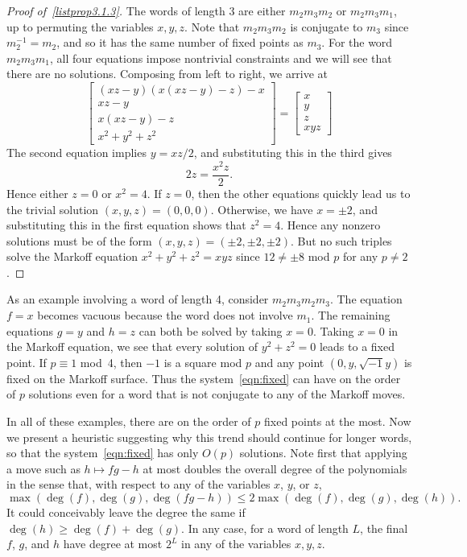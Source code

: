 \documentclass[10pt]{amsart}
\theoremstyle{definition}\newtheorem{defi}[theo]{Definition}\newtheorem{rema}[theo]{Remark}\newtheorem{exam}[theo]{Example}\newtheorem{exem}[theo]{Example}\newtheorem{nota}[theo]{Notation}
\begin{document}
\begin{proof}[{Proof of~\eqref{listprop3.1.3}}]
The words of length 3 are either $m_2m_3m_2$ or $m_2m_3m_1$, up to permuting the variables $x,y,z$. Note that $m_2m_3m_2$ is conjugate to $m_3$ since\linebreak$m_2^{-1}=m_2$, and so it has the same number of fixed points as $m_3$. For the word $m_2m_3m_1$, all four equations impose nontrivial constraints and we will see that there are no solutions. Composing from left to right, we arrive at
\[
\begin{bmatrix}
(xz-y)(x(xz-y)-z)-x \\
xz- y \\
x(xz-y) - z \\
x^2+y^2+z^2
\end{bmatrix} =
\begin{bmatrix}
x \\
y \\
z \\
xyz
\end{bmatrix}
\]
The second equation implies $y = xz/2$, and substituting this in the third gives
\[
2z = \frac{x^2z}{2}.
\]
Hence either $z=0$ or $x^2=4$. If $z=0$, then the other equations quickly lead us to the trivial solution $(x,y,z)=(0,0,0)$. Otherwise, we have $x = \pm 2$, and substituting this in the first equation shows that $z^2=4$. Hence any nonzero solutions must be of the form $(x,y,z) = (\pm 2, \pm 2, \pm 2)$. But no such triples solve the Markoff equation $x^2 + y^2 + z^2 = xyz$ since $12 \neq \pm 8$ mod $p$ for any $p \neq 2$.
\end{proof}

As an example involving a word of length 4, consider $m_2m_3m_2m_3$. The equation $f=x$ becomes vacuous because the word does not involve $m_1$. The remaining equations $g=y$ and $h=z$ can both be solved by taking $x=0$. Taking $x=0$ in the Markoff equation, we see that every solution of $y^2+z^2=0$ leads to a fixed point. If $p \equiv 1$ mod~4, then $-1$ is a square mod $p$ and any point $(0,y, \sqrt{-1}y)$ is fixed on the Markoff surface. Thus the system~\eqref{eqn:fixed} can have on the order of $p$ solutions even for a word that is not conjugate to any of the Markoff moves.

In all of these examples, there are on the order of $p$ fixed points at the most. Now we present a heuristic suggesting why this trend should continue for longer words, so that the system~\eqref{eqn:fixed} has only $O(p)$ solutions. Note first that applying a move such as $h \mapsto fg - h$ at most doubles the overall degree of the polynomials in the sense that, with respect to any of the variables $x$, $y$, or $z$,
\[
\max(\deg(f),\deg(g),\deg(fg-h)) \leq 2\max(\deg(f),\deg(g),\deg(h)).
\]
It could conceivably leave the degree the same if $\deg(h) \geq \deg(f)+\deg(g)$. In any case, for a word of length $L$, the final $f$, $g$, and $h$ have degree at most $2^L$ in any of the variables $x,y,z$.
\end{document}
